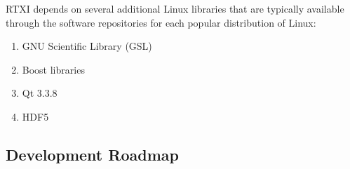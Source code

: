 RTXI depends on several additional Linux libraries that are typically available through the software repositories for each popular distribution of Linux:
\begin{enumerate}
\item GNU Scientific Library (GSL)
\item Boost libraries
\item Qt 3.3.8
\item HDF5
\end{enumerate}

\subsection{Development Roadmap}
\label{roadmap}